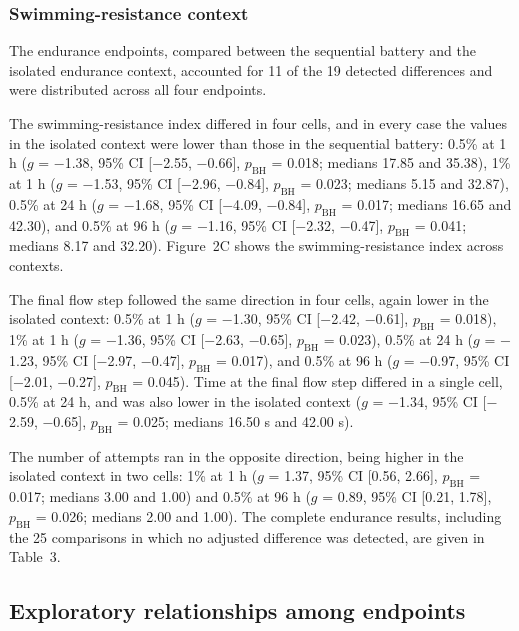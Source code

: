 \documentclass[12pt,a4paper]{article}
\begin{document}
\subsubsection{Swimming-resistance context}
\label{sec-3-2-3}

The endurance endpoints, compared between the sequential battery and the isolated endurance context, accounted for 11 of the 19 detected differences and were distributed across all four endpoints.

The swimming-resistance index differed in four cells, and in every case the values in the isolated context were lower than those in the sequential battery: 0.5\% at 1 h ($g$ = $-$1.38, 95\% CI [$-$2.55, $-$0.66], $p_{\mathrm{BH}}$ = 0.018; medians 17.85 and 35.38), 1\% at 1 h ($g$ = $-$1.53, 95\% CI [$-$2.96, $-$0.84], $p_{\mathrm{BH}}$ = 0.023; medians 5.15 and 32.87), 0.5\% at 24 h ($g$ = $-$1.68, 95\% CI [$-$4.09, $-$0.84], $p_{\mathrm{BH}}$ = 0.017; medians 16.65 and 42.30), and 0.5\% at 96 h ($g$ = $-$1.16, 95\% CI [$-$2.32, $-$0.47], $p_{\mathrm{BH}}$ = 0.041; medians 8.17 and 32.20). Figure~2C shows the swimming-resistance index across contexts.

The final flow step followed the same direction in four cells, again lower in the isolated context: 0.5\% at 1 h ($g$ = $-$1.30, 95\% CI [$-$2.42, $-$0.61], $p_{\mathrm{BH}}$ = 0.018), 1\% at 1 h ($g$ = $-$1.36, 95\% CI [$-$2.63, $-$0.65], $p_{\mathrm{BH}}$ = 0.023), 0.5\% at 24 h ($g$ = $-$1.23, 95\% CI [$-$2.97, $-$0.47], $p_{\mathrm{BH}}$ = 0.017), and 0.5\% at 96 h ($g$ = $-$0.97, 95\% CI [$-$2.01, $-$0.27], $p_{\mathrm{BH}}$ = 0.045). Time at the final flow step differed in a single cell, 0.5\% at 24 h, and was also lower in the isolated context ($g$ = $-$1.34, 95\% CI [$-$2.59, $-$0.65], $p_{\mathrm{BH}}$ = 0.025; medians 16.50 s and 42.00 s).

The number of attempts ran in the opposite direction, being higher in the isolated context in two cells: 1\% at 1 h ($g$ = 1.37, 95\% CI [0.56, 2.66], $p_{\mathrm{BH}}$ = 0.017; medians 3.00 and 1.00) and 0.5\% at 96 h ($g$ = 0.89, 95\% CI [0.21, 1.78], $p_{\mathrm{BH}}$ = 0.026; medians 2.00 and 1.00). The complete endurance results, including the 25 comparisons in which no adjusted difference was detected, are given in Table~3.

\subsection{Exploratory relationships among endpoints}
\label{sec-explore}
\end{document}

